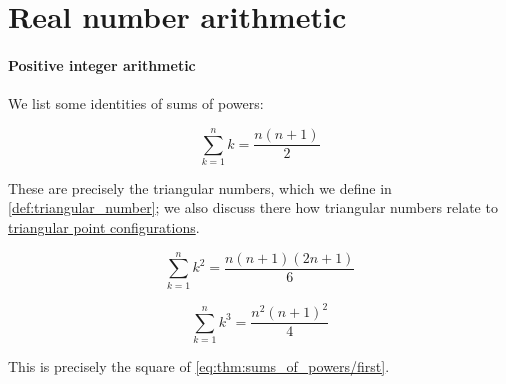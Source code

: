 \section{Real number arithmetic}\label{sec:real_number_arithmetic}

\paragraph{Positive integer arithmetic}

\begin{proposition}\label{thm:sums_of_powers}
  We list some identities of sums of powers:
  \begin{thmenum}
    \begin{equation}\label{eq:thm:sums_of_powers/first}
      \sum_{k=1}^n k = \frac {n (n+1)} 2
    \end{equation}

    These are precisely the triangular numbers, which we define in \cref{def:triangular_number}; we also discuss there how triangular numbers relate to \hyperref[def:triangular_point_configuration]{triangular point configurations}.

    \begin{equation}\label{eq:thm:sums_of_powers/second}
      \sum_{k=1}^n k^2 = \frac {n (n+1) (2n + 1)} 6
    \end{equation}

    \begin{equation}\label{eq:thm:sums_of_powers/third}
      \sum_{k=1}^n k^3 = \frac {n^2 (n+1)^2} 4
    \end{equation}

    This is precisely the square of \eqref{eq:thm:sums_of_powers/first}.
  \end{thmenum}
\end{proposition}
